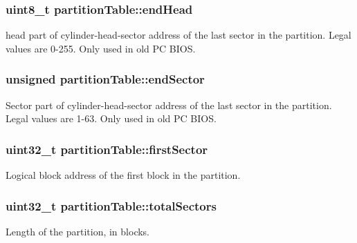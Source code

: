 \subsubsection[{\texorpdfstring{end\+Head}{endHead}}]{\setlength{\rightskip}{0pt plus 5cm}uint8\+\_\+t partition\+Table\+::end\+Head}\hypertarget{structpartition_table_a4a3945bfd3a29f474984cb9f180dbd51}{}\label{structpartition_table_a4a3945bfd3a29f474984cb9f180dbd51}
head part of cylinder-\/head-\/sector address of the last sector in the partition. Legal values are 0-\/255. Only used in old PC B\+I\+OS. 
\subsubsection[{\texorpdfstring{end\+Sector}{endSector}}]{\setlength{\rightskip}{0pt plus 5cm}unsigned partition\+Table\+::end\+Sector}\hypertarget{structpartition_table_a27cdc4320c418ed0d833ab163ed77ad7}{}\label{structpartition_table_a27cdc4320c418ed0d833ab163ed77ad7}
Sector part of cylinder-\/head-\/sector address of the last sector in the partition. Legal values are 1-\/63. Only used in old PC B\+I\+OS. 
\subsubsection[{\texorpdfstring{first\+Sector}{firstSector}}]{\setlength{\rightskip}{0pt plus 5cm}uint32\+\_\+t partition\+Table\+::first\+Sector}\hypertarget{structpartition_table_a02bbdff840c854dc96fa0b6da8589d86}{}\label{structpartition_table_a02bbdff840c854dc96fa0b6da8589d86}
Logical block address of the first block in the partition. 
\subsubsection[{\texorpdfstring{total\+Sectors}{totalSectors}}]{\setlength{\rightskip}{0pt plus 5cm}uint32\+\_\+t partition\+Table\+::total\+Sectors}\hypertarget{structpartition_table_acf96e59ce648a9a0cf35751c3b6d7730}{}\label{structpartition_table_acf96e59ce648a9a0cf35751c3b6d7730}
Length of the partition, in blocks. 
